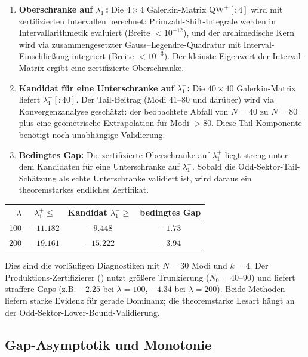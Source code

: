 ﻿\documentclass[12pt,a4paper]{article}
\theoremstyle{definition}
\theoremstyle{remark}
\begin{document}
\begin{enumerate}
\item \textbf{Oberschranke auf $\lambda_1^+$:} Die $4 \times 4$ Galerkin-Matrix $\mathrm{QW}^+[{:}4]$ wird mit zertifizierten Intervallen berechnet: Primzahl-Shift-Integrale werden in Intervallarithmetik evaluiert (Breite $< 10^{-12}$), und der archimedische Kern wird via zusammengesetzter Gauss--Legendre-Quadratur mit Interval-Einschließung integriert (Breite $< 10^{-3}$). Der kleinste Eigenwert der Interval-Matrix ergibt eine zertifizierte Oberschranke.

\item \textbf{Kandidat für eine Unterschranke auf $\lambda_1^-$:} Die $40 \times 40$ Galerkin-Matrix liefert $\lambda_1^-[{:}40]$. Der Tail-Beitrag (Modi $41$--$80$ und darüber) wird via Konvergenzanalyse geschätzt: der beobachtete Abfall von $N=40$ zu $N=80$ plus eine geometrische Extrapolation für Modi $>80$. Diese Tail-Komponente benötigt noch unabhängige Validierung.

\item \textbf{Bedingtes Gap:} Die zertifizierte Oberschranke auf $\lambda_1^+$ liegt streng unter dem Kandidaten für eine Unterschranke auf $\lambda_1^-$. Sobald die Odd-Sektor-Tail-Schätzung als echte Unterschranke validiert ist, wird daraus ein theoremstarkes endliches Zertifikat.
\end{enumerate}

\begin{center}
\renewcommand{\arraystretch}{1.2}
\begin{tabular}{r|c|c|c}
$\lambda$ & $\lambda_1^+ \leq$ & Kandidat $\lambda_1^- \geq$ & bedingtes Gap \\\hline
100 & $-11.182$ & $-9.448$ & $\mathbf{-1.73}$ \\
200 & $-19.161$ & $-15.222$ & $\mathbf{-3.94}$
\end{tabular}
\end{center}

\noindent Dies sind die vorläufigen Diagnostiken mit $N = 30$ Modi und $k = 4$. Der Produktions-Zertifizierer () nutzt größere Trunkierung ($N_0 = 40$--$90$) und liefert straffere Gaps (z.B. $-2.25$ bei $\lambda = 100$, $-4.34$ bei $\lambda = 200$). Beide Methoden liefern starke Evidenz für gerade Dominanz; die theoremstarke Lesart hängt an der Odd-Sektor-Lower-Bound-Validierung.

\subsection{Gap-Asymptotik und Monotonie}
\label{sec:gap-asymptotics}
\end{document}
